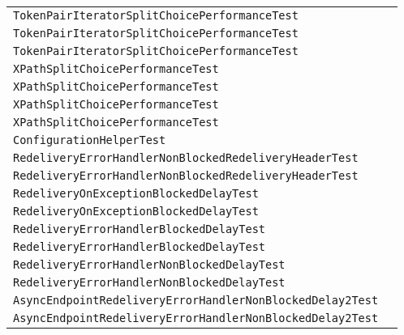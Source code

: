 \begin{center}
\begin{tabular}{ll}
\lstinline/TokenPairIteratorSplitChoicePerformanceTest/&\raisebox{0pt}{\lstinline/xxxtestTokenPairPerformanceRoute()/}\\
\lstinline/TokenPairIteratorSplitChoicePerformanceTest/&\raisebox{0pt}{\lstinline/xxxtestTokenPairPerformanceRoute()/}\\
\lstinline/TokenPairIteratorSplitChoicePerformanceTest/&\raisebox{0pt}{\lstinline/xxxtestTokenPairPerformanceRoute()/}\\
\lstinline/XPathSplitChoicePerformanceTest/&\raisebox{0pt}{\lstinline/xxTestXPatPerformanceRoute()/}\\
\lstinline/XPathSplitChoicePerformanceTest/&\raisebox{0pt}{\lstinline/xxTestXPatPerformanceRoute()/}\\
\lstinline/XPathSplitChoicePerformanceTest/&\raisebox{0pt}{\lstinline/xxTestXPatPerformanceRoute()/}\\
\lstinline/XPathSplitChoicePerformanceTest/&\raisebox{0pt}{\lstinline/xxTestXPatPerformanceRoute()/}\\
\lstinline/ConfigurationHelperTest/&\raisebox{0pt}{\lstinline/logConfigurationField(EndpointConfig,Fieldfield)/}\\
\lstinline/RedeliveryErrorHandlerNonBlockedRedeliveryHeaderTest/&\raisebox{0pt}{\lstinline/process(Exchange)/}\\
\lstinline/RedeliveryErrorHandlerNonBlockedRedeliveryHeaderTest/&\raisebox{0pt}{\lstinline/process(Exchange)/}\\
\lstinline/RedeliveryOnExceptionBlockedDelayTest/&\raisebox{0pt}{\lstinline/process(Exchange)/}\\
\lstinline/RedeliveryOnExceptionBlockedDelayTest/&\raisebox{0pt}{\lstinline/process(Exchange)/}\\
\lstinline/RedeliveryErrorHandlerBlockedDelayTest/&\raisebox{0pt}{\lstinline/process(Exchange)/}\\
\lstinline/RedeliveryErrorHandlerBlockedDelayTest/&\raisebox{0pt}{\lstinline/process(Exchange)/}\\
\lstinline/RedeliveryErrorHandlerNonBlockedDelayTest/&\raisebox{0pt}{\lstinline/process(Exchange)/}\\
\lstinline/RedeliveryErrorHandlerNonBlockedDelayTest/&\raisebox{0pt}{\lstinline/process(Exchange)/}\\
\lstinline/AsyncEndpointRedeliveryErrorHandlerNonBlockedDelay2Test/&\raisebox{0pt}{\lstinline/process(Exchange)/}\\
\lstinline/AsyncEndpointRedeliveryErrorHandlerNonBlockedDelay2Test/&\raisebox{0pt}{\lstinline/process(Exchange)/}\\

\end{tabular}
\end{center}
